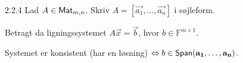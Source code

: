 \begin{lemma}{2.2.4}
	Lad $A \in \textsf{Mat}_{m,n}$. Skriv $A = [\vec{a_1}, \dotsc, \vec{a_n}]$ i 
	søjleform. 
	
	Betragt da ligningssystemet $A\vec{x} = \vec{b}$, hvor $b \in 
	\mathbb{F}^{m \times 1}$.

	Systemet er konsistent (har en løsning) $\Leftrightarrow b \in 
	\textsf{Span}(\mathbf{a_1}, \dotsc, \mathbf{a_n})$.
\end{lemma}
